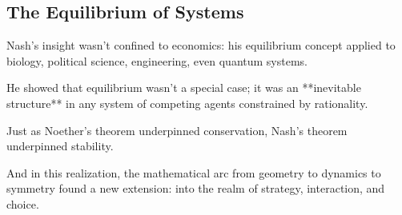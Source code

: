 \subsection*{The Equilibrium of Systems}

Nash’s insight wasn’t confined to economics:  
his equilibrium concept applied to biology, political science, engineering, even quantum systems.

He showed that equilibrium wasn’t a special case;  
it was an **inevitable structure** in any system of competing agents constrained by rationality.

Just as Noether’s theorem underpinned conservation,  
Nash’s theorem underpinned stability.

And in this realization, the mathematical arc from geometry to dynamics to symmetry found a new extension:  
into the realm of strategy, interaction, and choice.

